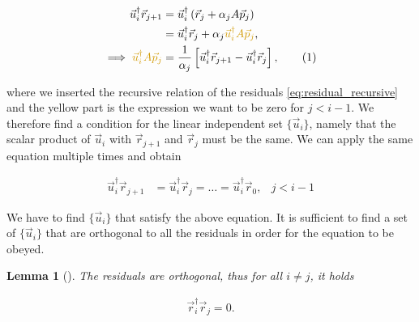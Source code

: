 \documentclass{article}
\newcommand\numberthis{\addtocounter{equation}{1}\tag{\theequation}}
\theoremstyle{plain} %
\newtheorem{lemma}[theorem]{Lemma}
\theoremstyle{convention} %
\theoremstyle{remark} %
\numberwithin{equation}{section}
\begin{document}
\begin{align*}
    \vec{u}_i^{\dagger} \vec{r}_{j+1} &= \vec{u}_i^{\dagger} \left( \vec{r}_j + \alpha_j A \vec{p}_j \right) \\
    &= \vec{u}_i^{\dagger} \vec{r}_j + \alpha_j \textcolor{cyellow}{\vec{u}_i^{\dagger} A \vec{p}_j}, \\
    \implies \textcolor{cyellow}{\vec{u}_i^{\dagger} A \vec{p}_j} &= \frac{1}{\alpha_j} \left[ \vec{u}_i^{\dagger} \vec{r}_{j+1} - \vec{u}_i^{\dagger} \vec{r}_j \right], \numberthis \label{eq:uiAdj}
\end{align*}

where we inserted the recursive relation of the residuals \eqref{eq:residual_recursive} and the \textcolor{cyellow}{yellow} part is the expression we want to be \textcolor{cyellow}{zero} for $j<i-1$. We therefore find a condition for the linear independent set $\{\vec{u}_i\}$, namely that the scalar product of $\vec{u}_i$ with $\vec{r}_{j+1}$ and $\vec{r}_{j}$ must be the same. We can apply the same equation multiple times and obtain

\begin{align*}
    \vec{u}_i^{\dagger} \vec{r}_{j+1} &= \vec{u}_i^{\dagger} \vec{r}_j = \dots = \vec{u}_i^{\dagger} \vec{r}_0, &j<i-1
\end{align*}

We have to find $\{\vec{u}_i\}$ that satisfy the above equation. It is sufficient to find a set of $\{\vec{u}_i\}$ that are orthogonal to all the residuals in order for the equation to be obeyed.

\begin{lemma}[]
\label{lem:rorthogonality}
The residuals are orthogonal, thus for all $i \neq j$, it holds

\begin{align*}
    \vec{r}_i^{\dagger} \vec{r}_j = 0.
\end{align*}

\end{lemma}
\end{document}

